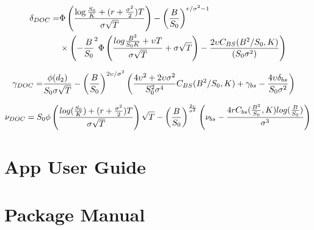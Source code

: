 \documentclass[11pt,a4paper,fleqn,draft]{article}
\begin{document}
\begin{align*}
\delta_{DOC} =& \Phi\left({\log{S_0 \over K} + (r + {\sigma^2 \over 2})T \over \sigma\sqrt{T}}\right)- \left({B\over S_0}\right)^{r /\sigma^2 - 1}\\
&\times \left(-{B\over S_0}^2 \Phi\left({log{B^2 \over S_0K} + \upsilon T \over \sigma \sqrt{T}} + \sigma \sqrt{T}\right) - {2 \upsilon C_{BS}(B^2 / S_0, K) \over (S_0\sigma^2)}\right)
\end{align*}

\begin{align*}
\gamma_{DOC} =& {\phi(d_2) \over S_0\sigma\sqrt{T}}- \left({B \over S_0}\right)^{ 2\upsilon / \sigma^2}\left({4\upsilon^2 +2\upsilon \sigma^2\over S_0^2\sigma^4}C_{BS}(B^2 / S_0, K) + \gamma_{bs} - {4\upsilon\delta_{bs} \over S_0\sigma^2}\right)
\end{align*}

\begin{align*}
\nu_{DOC} = S_0\phi\left(\frac{log({S_0 \over K}) + (r + {\sigma^2 \over 2})T}{\sigma\sqrt{T}}\right)\sqrt{T}-\left({B \over S_0}\right)^{2\upsilon \over \sigma^2}\left(\nu_{bs} - {4rC_{bs}({B^2\over S_0}, K)log({B\over S_0}) \over \sigma^3}\right)
\end{align*}

\newpage
\section{App User Guide}


\newpage
\section{Package Manual}
\end{document}
